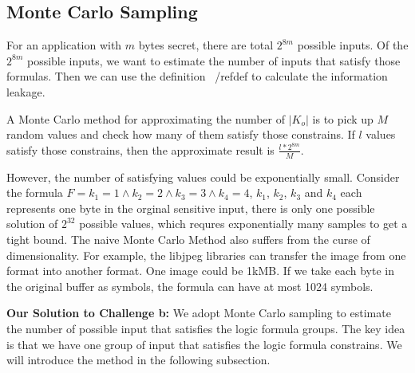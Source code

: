 \subsection{Monte Carlo Sampling}
\label{MCreasons}
For an application with $m$ bytes secret, there are total $2^{8m}$ possible inputs. Of the
$2^{8m}$ possible inputs, we want to estimate the number of inputs that satisfy those formulas.
Then we can use the definition ~/ref{def} to calculate the information leakage.

A Monte Carlo method for approximating the number of $|K_o|$ is to pick up 
$M$ random values and check how many of them satisfy those constrains. If $l$ values
satisfy those constrains, then the approximate result is $\frac{l*2^{8m}}{M}$.

However, the number of satisfying values could be exponentially small. Consider the formula
$F={k_1} = 1\land{k_2} = 2\land{k_3} = 3\land{k_4} = 4$, $k_1$, $k_2$, $k_3$ and $k_4$ each represents
one byte in the orginal sensitive input, there is only one possible solution of $2^{32}$ possible
values, which requres exponentially many samples to get a tight bound. 
The naive Monte Carlo Method also suffers from the curse of dimensionality. For example, 
the libjpeg libraries can transfer the image from one format into another format. One image could
be 1kMB. If we take each byte in the original buffer as symbols, the formula can have at most
1024 symbols. 

\vspace*{6pt}
\textbf{Our Solution to Challenge b:}
We adopt Monte Carlo sampling to estimate the number of possible input
that satisfies the logic formula groups. The key idea is that we have one group of input that satisfies
the logic formula constrains.  We will
introduce the method in the following subsection.
